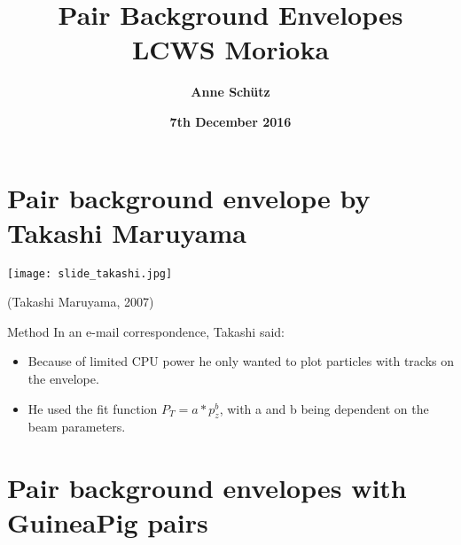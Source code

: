 \documentclass[xcolor={dvipsnames}]{beamer}
\title[ILC \& Pair Background Envelopes]{\textbf{\LARGE Pair Background Envelopes} \\ \vspace*{0.3cm} \small LCWS Morioka}
\author[Anne Sch\"utz]{\textbf{Anne Sch\"utz}}
\institute{\textbf{DESY}}
\date{\textbf{7th December 2016}}
\begin{document}
{
\begin{frame}
  \titlepage
\end{frame}
}
\begin{frame}
  \tableofcontents
\end{frame}

\section{Pair background envelope by Takashi Maruyama}
\begin{frame}
\begin{center}
  \texttt{[image: slide\_takashi.jpg]}
\end{center}
 \begin{flushright} 
  (Takashi Maruyama, 2007)
 \end{flushright}
\end{frame}
\begin{frame}{Method}
 In an e-mail correspondence, Takashi said:
 \begin{itemize}
 \item Because of limited CPU power he only wanted to plot particles with tracks on the envelope.
 \item He used the fit function $P_T = a*p_z^b$, with a and b being dependent on the beam parameters.
\end{itemize}
\end{frame}

\section{Pair background envelopes with GuineaPig pairs}
\end{document}
